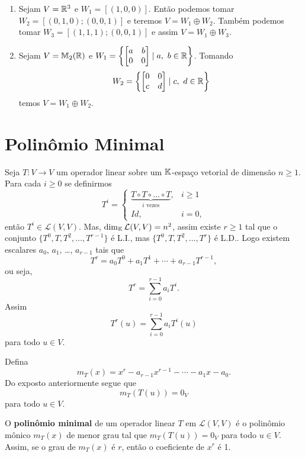 \begin{exemplo}
	\begin{enumerate}
		\item Sejam $V = \mathbb{R}^3$ e $W_1 = [(1,0,0)]$. Ent\~ao podemos tomar $W_2 = [(0,1,0); (0,0,1)]$ e teremos $V = W_1 \oplus W_2$. Tamb\'em podemos tomar $W_3 = [(1,1,1); (0,0,1)]$ e assim $V = W_1
		\oplus W_3$.
		\item Sejam $V = \mathbb{M}_2(\mathbb{R})$ e $W_1 = \left\{\begin{bmatrix}
			a & b\\ 0 & 0
		\end{bmatrix} \mid a,\ b \in \mathbb{R}\right\}$. Tomando
		\[
			W_2 = \left\{\begin{bmatrix}
			0 & 0\\ c & d
		\end{bmatrix} \mid c,\ d \in \mathbb{R}\right\}
		\]
		temos $V = W_1 \oplus W_2$.
	\end{enumerate}
\end{exemplo}


\section{Polin\^omio Minimal} %
\label{sec:polinomio_minimal}

Seja $T : V \to V$ um operador linear sobre um $\mathbb{K}$-espa\c{c}o vetorial de dimens\~ao $n \ge 1$. Para cada $i \ge 0$ se definirmos
\[
	T^i = \begin{cases}
		\underbrace{T\circ T \circ \dots \circ T}_{i \mbox{ vezes}}, & i \ge 1\\
		Id, & i = 0,
	\end{cases}
\]
ent\~ao $T^i \in \mathcal{L}(V,V)$. Mas, $\dim_{\mathbb{K}} \mathcal{L}(V,V) = n^2$, assim existe $r \ge 1$ tal que o conjunto $\{T^0, T, T^2, \dots, T^{r - 1}\}$ \'e L.I., mas $\{T^0, T, T^2, \dots, T^r\}$ \'e L.D.. Logo existem escalares $a_0$, $a_1$, \dots, $a_{r - 1}$ tais que
\[
	T^r = a_0T^0 + a_1T^1 + \cdots + a_{r - 1}T^{r - 1},
\]
ou seja,
\[
	T^r = \sum_{i = 0}^{r - 1}a_iT^i.
\]
Assim
\[
	T^r(u) = \sum_{i = 0}^{r - 1}a_iT^i(u)
\]
para todo $u \in V$.

Defina
\[
	m_T(x) = x^r - a_{r - 1}x^{r - 1} - \cdots - a_1x - a_0.
\]
Do exposto anteriormente segue que
\[
	m_T(T(u)) = 0_V
\]
para todo $u \in V$.

\begin{definicao}
	O \textbf{polin\^omio minimal} de um operador linear $T$ em $\mathcal{L}(V,V)$ \'e o polin\^omio m\^onico $m_T(x)$ de menor grau tal que $m_T(T(u)) = 0_V$ para todo $u \in V$. Assim, se o grau de $m_T(x)$ \'e $r$, ent\~ao o coeficiente de $x^r$ \'e 1.
\end{definicao}

